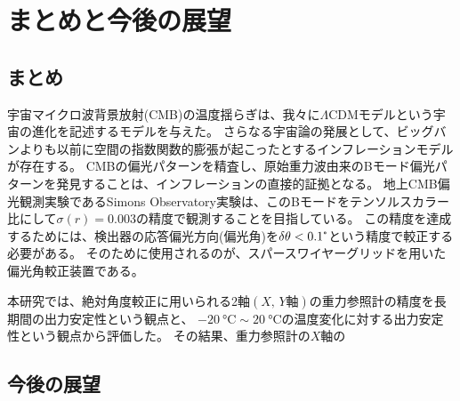 \documentclass[../../main.tex]{subfiles}
\begin{document}
\chapter{まとめと今後の展望}
\section{まとめ}
宇宙マイクロ波背景放射(CMB)の温度揺らぎは、我々に$\Lambda \mathrm{CDM}$モデルという宇宙の進化を記述するモデルを与えた。
さらなる宇宙論の発展として、ビッグバンよりも以前に空間の指数関数的膨張が起こったとするインフレーションモデルが存在する。
CMBの偏光パターンを精査し、原始重力波由来のBモード偏光パターンを発見することは、インフレーションの直接的証拠となる。
地上CMB偏光観測実験であるSimons Observatory実験は、このBモードをテンソルスカラー比にして$\sigma(r)=0.003$の精度で観測することを目指している。
この精度を達成するためには、検出器の応答偏光方向(偏光角)を$\delta\theta<0.1\tcdegree$という精度で較正する必要がある。
そのために使用されるのが、スパースワイヤーグリッドを用いた偏光角較正装置である。

本研究では、絶対角度較正に用いられる2軸$(X,\,Y\text{軸})$の重力参照計の精度を長期間の出力安定性という観点と、
$\SI{-20}{\degreeCelsius}\sim\SI{20}{\degreeCelsius}$の温度変化に対する出力安定性という観点から評価した。
その結果、重力参照計の$X$軸の



\section{今後の展望}
\end{document}
